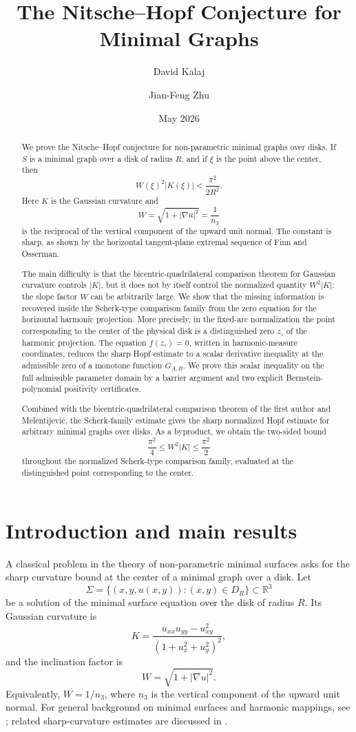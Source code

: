 \documentclass[11pt]{amsart}
\title[The Nitsche--Hopf conjecture for minimal graphs]{The Nitsche--Hopf Conjecture for Minimal Graphs}
\author{David Kalaj}
\author{Jian-Feng Zhu}
\date{May 2026}
\theoremstyle{remark}
\numberwithin{equation}{section}
\begin{document}
\begin{abstract}
We prove the Nitsche--Hopf conjecture for non-parametric minimal graphs over
disks.  If \(S\) is a minimal graph over a disk of radius \(R\), and if
\(\xi\) is the point above the center, then
\[
        W(\xi)^2 |K(\xi)|<\frac{\pi^2}{2R^2}.
\]
Here \(K\) is the Gaussian curvature and
\[
        W=\sqrt{1+|\nabla u|^2}=\frac1{n_3}
\]
is the reciprocal of the vertical component of the upward unit normal.  The constant is sharp, as shown by the horizontal tangent-plane extremal
sequence of Finn and Osserman.

The main difficulty is that the bicentric-quadrilateral comparison theorem
for Gaussian curvature controls \(|K|\), but it does not by itself control
the normalized quantity \(W^2|K|\): the slope factor \(W\) can be arbitrarily
large.  We show that the missing information is recovered inside the
Scherk-type comparison family from the zero equation for the horizontal
harmonic projection.  More precisely, in the fixed-arc normalization the
point corresponding to the center of the physical disk is a distinguished
zero \(z_\circ\) of the harmonic projection.  The equation
\(f(z_\circ)=0\), written in harmonic-measure coordinates, reduces the sharp
Hopf estimate to a scalar derivative inequality at the admissible zero of a
monotone function \(G_{A,B}\).  We prove this scalar inequality on the full
admissible parameter domain by a barrier argument and two explicit
Bernstein-polynomial positivity certificates.

Combined with the bicentric-quadrilateral comparison theorem of the first author and
Melentijevi\'c, the Scherk-family estimate gives the sharp
normalized Hopf estimate for arbitrary minimal graphs over disks.  As a
byproduct, we obtain the two-sided bound
\[
        \frac{\pi^2}{4}\le W^2|K|\leq \frac{\pi^2}{2}
\]
throughout the normalized Scherk-type comparison family, evaluated at the
distinguished point corresponding to the center. 
\end{abstract}

\maketitle

\section{Introduction and main results}

A classical problem in the theory of non-parametric minimal surfaces asks for
the sharp curvature bound at the center of a minimal graph over a disk.  Let
\[
        \Sigma=\{(x,y,u(x,y)):(x,y)\in D_R\}\subset\mathbb R^3
\]
be a solution of the minimal surface equation over the disk of radius \(R\).
Its Gaussian curvature is
\[
        K=\frac{u_{xx}u_{yy}-u_{xy}^2}
        {(1+u_x^2+u_y^2)^2},
\]
and the inclination factor is
\[
        W=\sqrt{1+|\nabla u|^2}.
\]
Equivalently, \(W=1/n_3\), where \(n_3\) is the vertical component of the
upward unit normal.  For general background on minimal surfaces and harmonic
mappings, see \cite{AlarconForstnericLopez2021,Duren2004,Nitsche1975}; related
sharp-curvature estimates are discussed in \cite{Hall1998}.
\end{document}
